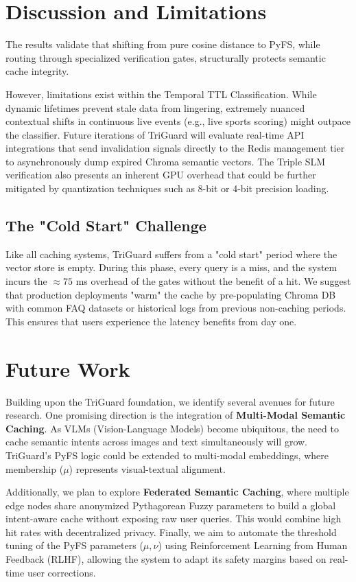 \documentclass[sigconf]{acmart}
\begin{document}
\section{Discussion and Limitations}

The results validate that shifting from pure cosine distance to PyFS, while routing through specialized verification gates, structurally protects semantic cache integrity. 

However, limitations exist within the Temporal TTL Classification. While dynamic lifetimes prevent stale data from lingering, extremely nuanced contextual shifts in continuous live events (e.g., live sports scoring) might outpace the classifier. Future iterations of TriGuard will evaluate real-time API integrations that send invalidation signals directly to the Redis management tier to asynchronously dump expired Chroma semantic vectors. The Triple SLM verification also presents an inherent GPU overhead that could be further mitigated by quantization techniques such as 8-bit or 4-bit precision loading.

\subsection{The "Cold Start" Challenge}
Like all caching systems, TriGuard suffers from a "cold start" period where the vector store is empty. During this phase, every query is a miss, and the system incurs the $\approx 75$ ms overhead of the gates without the benefit of a hit. We suggest that production deployments "warm" the cache by pre-populating Chroma DB with common FAQ datasets or historical logs from previous non-caching periods. This ensures that users experience the latency benefits from day one.

\section{Future Work}
Building upon the TriGuard foundation, we identify several avenues for future research. One promising direction is the integration of \textbf{Multi-Modal Semantic Caching}. As VLMs (Vision-Language Models) become ubiquitous, the need to cache semantic intents across images and text simultaneously will grow. TriGuard's PyFS logic could be extended to multi-modal embeddings, where membership ($\mu$) represents visual-textual alignment.

Additionally, we plan to explore \textbf{Federated Semantic Caching}, where multiple edge nodes share anonymized Pythagorean Fuzzy parameters to build a global intent-aware cache without exposing raw user queries. This would combine high hit rates with decentralized privacy. Finally, we aim to automate the threshold tuning of the PyFS parameters ($\mu, \nu$) using Reinforcement Learning from Human Feedback (RLHF), allowing the system to adapt its safety margins based on real-time user corrections.
\end{document}
